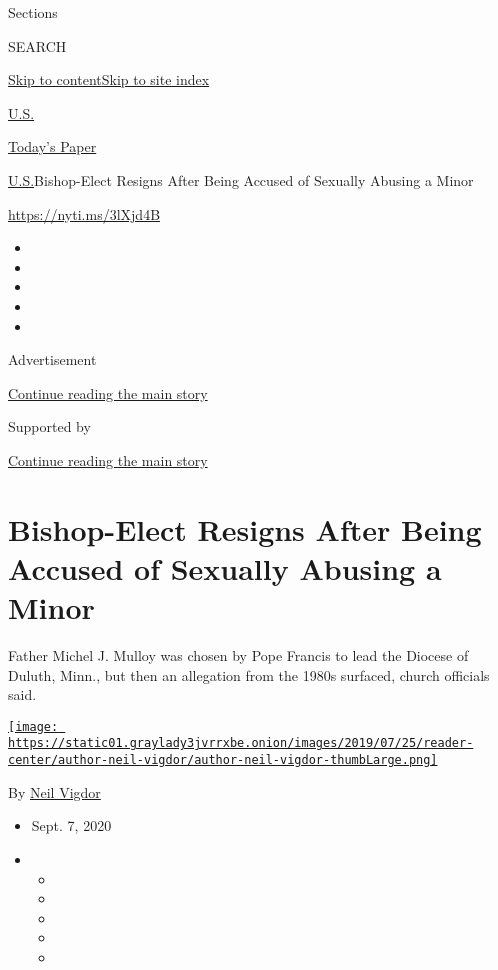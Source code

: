 Sections

SEARCH

\protect\hyperlink{site-content}{Skip to
content}\protect\hyperlink{site-index}{Skip to site index}

\href{https://www.nytimes3xbfgragh.onion/section/us}{U.S.}

\href{https://myaccount.nytimes3xbfgragh.onion/auth/login?response_type=cookie\&client_id=vi}{}

\href{https://www.nytimes3xbfgragh.onion/section/todayspaper}{Today's
Paper}

\href{/section/us}{U.S.}\textbar{}Bishop-Elect Resigns After Being
Accused of Sexually Abusing a Minor

\url{https://nyti.ms/3lXjd4B}

\begin{itemize}
\item
\item
\item
\item
\item
\end{itemize}

Advertisement

\protect\hyperlink{after-top}{Continue reading the main story}

Supported by

\protect\hyperlink{after-sponsor}{Continue reading the main story}

\hypertarget{bishop-elect-resigns-after-being-accused-of-sexually-abusing-a-minor}{%
\section{Bishop-Elect Resigns After Being Accused of Sexually Abusing a
Minor}\label{bishop-elect-resigns-after-being-accused-of-sexually-abusing-a-minor}}

Father Michel J. Mulloy was chosen by Pope Francis to lead the Diocese
of Duluth, Minn., but then an allegation from the 1980s surfaced, church
officials said.

\href{https://www.nytimes3xbfgragh.onion/by/neil-vigdor}{\texttt{[image: https://static01.graylady3jvrrxbe.onion/images/2019/07/25/reader-center/author-neil-vigdor/author-neil-vigdor-thumbLarge.png]}}

By \href{https://www.nytimes3xbfgragh.onion/by/neil-vigdor}{Neil Vigdor}

\begin{itemize}
\item
  Sept. 7, 2020
\item
  \begin{itemize}
  \item
  \item
  \item
  \item
  \item
  \end{itemize}
\end{itemize}

